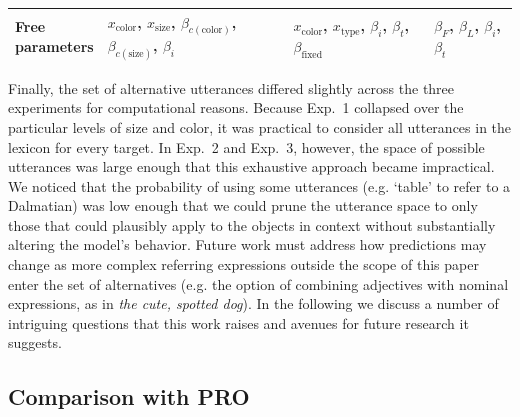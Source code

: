 \documentclass[11pt]{article}
\begin{document}
\begin{table}
\begin{tabular}{p{2.5cm} p{4.2cm} p{4.2cm} p{4.2cm} }
\midrule
\makecell{Free\\ parameters} & 
	\makecell{$x_{\textrm{color}}$, $x_{\textrm{size}}$, \\ $\beta_{c(\textrm{color})}$,  $\beta_{c(\textrm{size})}$, $\beta_i$} & 
	\makecell{$x_{\textrm{color}}$, $x_{\textrm{type}}$, \\ $\beta_i$, $\beta_t$, $\beta_{\textrm{fixed}}$} & 
	$\beta_F$, $\beta_L$, $\beta_i$, $\beta_t$ \\
\bottomrule
\end{tabular}
\label{tab:modeldiffs}
\end{table}

Finally, the set of alternative utterances differed slightly across the three experiments for computational reasons.
Because Exp.~1 collapsed over the particular levels of size and color, it was practical to consider all utterances in the lexicon for every target. 
In Exp.~2 and Exp.~3, however, the space of possible utterances was large enough that this exhaustive approach became impractical. 
We noticed that the probability of using some utterances (e.g. `table' to refer to a Dalmatian)  was low enough that we could prune the utterance space to only those that could plausibly apply to the objects in context without substantially altering the model's behavior.
Future work must address how predictions may change as more complex referring expressions outside the scope of this paper enter the set of alternatives (e.g. the option of combining adjectives with nominal expressions, as in \emph{the cute, spotted dog}).
In the following we discuss a number of intriguing questions that this work raises and avenues for future research it suggests.

\subsection{Comparison with PRO}
\end{document}
